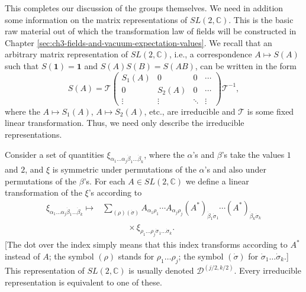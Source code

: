 This completes our discussion of the groups themselves. We need in addition
some information on the matrix representations of $SL(2,\mathbb C)$. This is
the basic raw material out of which the transformation law of fields will be
constructed in Chapter \ref{sec:ch3-fields-and-vacuum-expectation-values}. We recall that an arbitrary matrix representation of
$SL(2,\mathbb C)$, i.e., a correspondence $A\longmapsto S(A)$ such that
$S(\mathbf{1})=\mathbf{1}$ and $S(A)S(B)=S(AB)$, can be written in the form
\begin{equation}
  S(A)=\mathcal T
  \begin{pmatrix}
    S_1(A)&0&0&\cdots\\
    0&S_2(A)&0&\cdots\\
    \vdots&\vdots&\ddots&\vdots
  \end{pmatrix}
  \mathcal T^{-1},
  \tag{1-25}\label{eq:ch1-sl2-representation-block}
\end{equation}
where the $A\longmapsto S_1(A)$, $A\longmapsto S_2(A)$, etc., are
irreducible and $\mathcal T$ is some fixed linear transformation. Thus, we
need only describe the irreducible representations.

Consider a set of quantities
$\xi_{\alpha_1\ldots\alpha_j\dot\beta_1\ldots\dot\beta_k}$, where the
$\alpha$'s and $\beta$'s take the values $1$ and $2$, and $\xi$ is symmetric
under permutations of the $\alpha$'s and also under permutations of the
$\beta$'s. For each $A\in SL(2,\mathbb C)$ we define a linear transformation
of the $\xi$'s according to
\begin{equation}
\begin{aligned}
  \xi_{\alpha_1\ldots\alpha_j\dot\beta_1\ldots\dot\beta_k}
  \longmapsto{}&
  \sum_{(\rho)(\dot\sigma)}
  A_{\alpha_1\rho_1}\cdots A_{\alpha_j\rho_j}
  (A^*)_{\dot\beta_1\dot\sigma_1}\cdots
  (A^*)_{\dot\beta_k\dot\sigma_k}\\[-2pt]
  &\hspace{3em}\times
  \xi_{\rho_1\ldots\rho_j\dot\sigma_1\ldots\dot\sigma_k}.
\end{aligned}
\tag{1-26}\label{eq:ch1-sl2-irreps}
\end{equation}
[The dot over the index simply means that this index transforms according to
$A^*$ instead of $A$; the symbol $(\rho)$ stands for
$\rho_1\ldots\rho_j$; the symbol $(\dot\sigma)$ for
$\dot\sigma_1\ldots\dot\sigma_k$.] This representation of
$SL(2,\mathbb C)$ is usually denoted
$\mathcal D^{(j/2,k/2)}$. Every irreducible representation is equivalent to
one of these.

